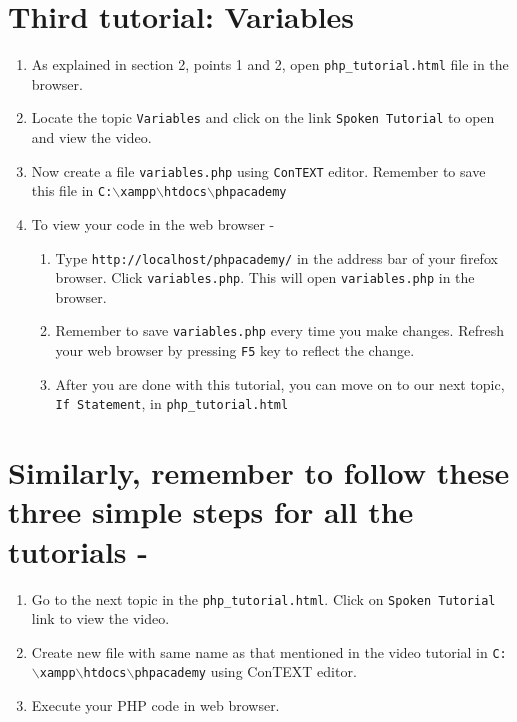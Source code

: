 \documentclass[11pt]{article}
\newenvironment{enumcpt}{\begin{enumerate} \topsep 0pt \partopsep 0pt 
                        \parsep 0pt
                        \itemsep 0pt \leftmargin -1in \rightmargin 0pt
                        }{\end{enumerate}}
\begin{document}
\begin{multicols}{2}
\section{Third tutorial: Variables}
\begin{enumcpt}
\item As explained in section 2, points 1 and 2, open {\tt php\_tutorial.html} file in the browser.
\item Locate the topic {\tt Variables} and click on the link {\tt Spoken Tutorial} to open and view the video.
\item Now create a file {\tt variables.php} using {\tt ConTEXT} editor. Remember to save this file in 
{\tt C:$\backslash$xampp$\backslash$htdocs$\backslash$phpacademy}
\item To view your code in the web browser -
\begin{enumcpt}
\item Type {\tt http://localhost/phpacademy/} in the address bar of your firefox browser. Click {\tt variables.php}. This will open {\tt variables.php} in the browser.
\item Remember to save {\tt variables.php} every time you make changes.  Refresh your web browser by pressing {\tt F5} key to reflect the change.
\item After you are done with this tutorial, you can move on to our next topic, {\tt If Statement}, in {\tt php\_tutorial.html} 
\end{enumcpt}
\end{enumcpt}

\section{Similarly, remember to follow these three simple steps for all the tutorials - }
\begin{enumcpt}
\item Go to the next topic in the {\tt php\_tutorial.html}. Click on {\tt Spoken Tutorial} link to view the video.
\item Create new file with same name as that mentioned in the video tutorial in {\tt C:$\backslash$xampp$\backslash$htdocs$\backslash$phpacademy} using ConTEXT editor.
\item Execute your PHP code in web browser.
\end{enumcpt}

\end{multicols}
\end{document}

